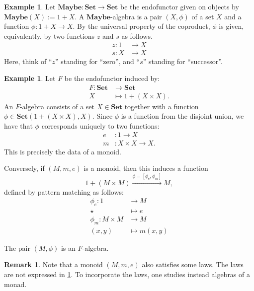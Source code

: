 \documentclass[a4paper,11pt, oneside,titlepage=false]{scrbook}
\theoremstyle{plain}
\theoremstyle{definition}
\newtheorem{rem}[thm]{Remark}
\newtheorem{exa}[thm]{Example}
\newcommand{\Catb}[1]{\mathbf{#1}}
\newcommand{\Maybe}{\Catb{Maybe}}
\newcommand{\SET}{\Catb{Set}}
\newcommand{\CHom}[3]{{#1}(#2,#3)}
\begin{document}
\begin{exa}\label{exa:nno_initial_alg_maybe}
 Let $\Maybe : \SET \to \SET$ be the endofunctor given on objects by $\Maybe(X) := 1 + X$.
 A $\Maybe$-algebra is a pair $(X,\phi)$ of a set $X$ and a function $\phi : 1 + X \to X$.
 By the universal property of the coproduct, $\phi$ is given, equivalently,
 by two functions $z$ and $s$ as follows.
 \begin{align*}
    z : 1 &\to X
    \\
    s : X &\to X
 \end{align*}
Here, think of ``$z$'' standing for ``zero'', and ``$s$'' standing for ``successor''.
\end{exa}


\begin{exa}\label{example:algebra_of_monoids} Let $F$ be the endofunctor induced by:
\begin{align*}
  F: \SET &\to \SET
  \\
  X &\mapsto 1 + (X\times X).
\end{align*}
An $F$-algebra consists of a set $X\in\SET$ together with a function $\phi\in\CHom{\SET}{1 + (X\times X)}{X}$. Since $\phi$ is a function from the disjoint union, we have that $\phi$ corresponds uniquely to two functions:
\begin{align*}
e &: 1\to X
\\
m &: X\times X\to X.
\end{align*}
This is precisely the data of a monoid.

Conversely, if $(M,m,e)$ is a monoid, then this induces a function
\[
1 + (M\times M) \xrightarrow{\phi = [\phi_e,\phi_m]} M,
\]
defined by pattern matching as follows:
\begin{align*}
\phi_e : 1 &\to M
\\
\star &\mapsto e
\\
\phi_m : M\times M &\to M
\\
(x,y) &\mapsto m(x,y)
\end{align*}

The pair $(M, \phi)$ is an $F$-algebra.

\end{exa}

\begin{rem}
 Note that a monoid $(M,m,e)$ also satisfies some laws.
 The laws are not expressed in \cref{example:algebra_of_monoids}.
 To incorporate the laws, one studies instead algebras of a monad.
\end{rem}
\end{document}
